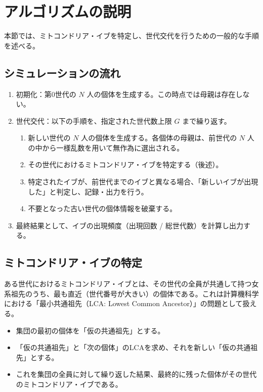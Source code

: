 \documentclass[a4paper,11pt]{jsarticle}
\begin{document}
\section{アルゴリズムの説明}
本節では、ミトコンドリア・イブを特定し、世代交代を行うための一般的な手順を述べる。

\subsection{シミュレーションの流れ}
\begin{enumerate}
    \item 初期化：第0世代の $N$ 人の個体を生成する。この時点では母親は存在しない。
    \item 世代交代：以下の手順を、指定された世代数上限 $G$ まで繰り返す。
    \begin{enumerate}
        \item 新しい世代の $N$ 人の個体を生成する。各個体の母親は、前世代の $N$ 人の中から一様乱数を用いて無作為に選出される。
        \item その世代におけるミトコンドリア・イブを特定する（後述）。
        \item 特定されたイブが、前世代までのイブと異なる場合、「新しいイブが出現した」と判定し、記録・出力を行う。
        \item 不要となった古い世代の個体情報を破棄する。
    \end{enumerate}
    \item 最終結果として、イブの出現頻度（出現回数 / 総世代数）を計算し出力する。
\end{enumerate}

\subsection{ミトコンドリア・イブの特定}
ある世代におけるミトコンドリア・イブとは、その世代の全員が共通して持つ女系祖先のうち、最も直近（世代番号が大きい）の個体である。これは計算機科学における「最小共通祖先（LCA: Lowest Common Ancestor）」の問題として扱える。
\begin{itemize}
    \item 集団の最初の個体を「仮の共通祖先」とする。
    \item 「仮の共通祖先」と「次の個体」のLCAを求め、それを新しい「仮の共通祖先」とする。
    \item これを集団の全員に対して繰り返した結果、最終的に残った個体がその世代のミトコンドリア・イブである。
\end{itemize}
\end{document}
